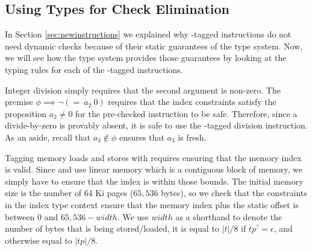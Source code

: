 \subsection{Using Types for Check Elimination}
In Section \ref{sec:newinstructions} we explained why \prechk-tagged instructions do not need dynamic checks because of their static guarantees of the \name type system.
Now, we will see how the \name type system provides those guarantees by looking at the typing rules for each of the \prechk-tagged instructions.

Integer division simply requires that the second argument is non-zero.
The premise $\phi \implies \neg(=\ a_2\ 0)$ requires that the index constraints satisfy the proposition $a_2 \neq 0$ for the pre-checked instruction to be safe.
Therefore, since a divide-by-zero is provably absent, it is safe to use the \prechk-tagged division instruction.
As an aside, recall that $a_3 \not\in \phi$ ensures that $a_3$ is fresh.
\begin{mathpar}
\end{mathpar}

Tagging memory loads and stores with \prechk requires ensuring that the memory index is valid.
Since \wasm and \name use linear memory which is a contiguous block of memory, we simply have to ensure that the index is within those bounds.
The initial memory size is the number of $64$ Ki pages ($65,536$ bytes), so we check that the constraints in the index type context ensure that the memory index plus the static offset is between $0$ and $65,536-width$.
We use $width$ as a shorthand to denote the number of bytes that is being stored/loaded, it is equal to $|t|/8$ if $tp^{?}=\epsilon$, and otherwise equal to $|tp|/8$.

